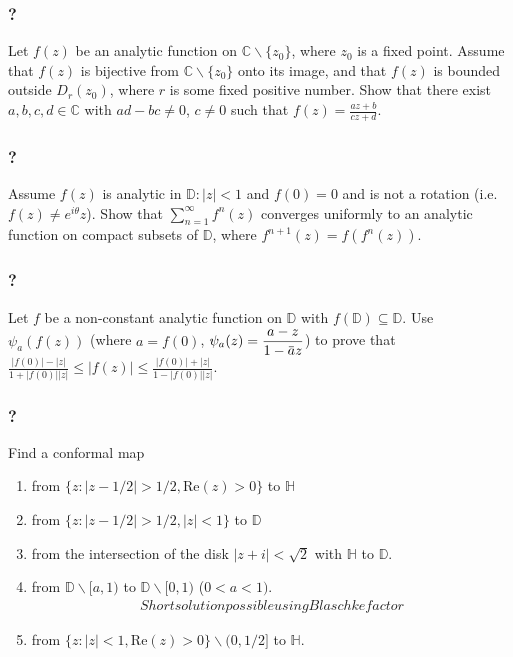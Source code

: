 \hypertarget{section-169}{%
\subsubsection{?}\label{section-169}}

Let \(f(z)\) be an analytic function on
\({\mathbb C} \backslash \{ z_0 \}\), where \(z_0\) is a fixed point.
Assume that \(f(z)\) is bijective from
\({\mathbb C} \backslash \{ z_0 \}\) onto its image, and that \(f(z)\)
is bounded outside \(D_r(z_0)\), where \(r\) is some fixed positive
number. Show that there exist \(a, b, c, d \in \mathbb C\) with
\(ad-bc \neq 0\), \(c \neq 0\) such that
\(\displaystyle f(z) = \frac{az + b}{cz + d}\).

\hypertarget{section-170}{%
\subsubsection{?}\label{section-170}}

Assume \(f(z)\) is analytic in \({\mathbb D}: |z|<1\) and \(f(0)=0\) and
is not a rotation (i.e.~\(f(z) \neq e^{i \theta} z\)). Show that
\(\displaystyle \sum_{n=1}^\infty f^{n}(z)\) converges uniformly to an
analytic function on compact subsets of \({\mathbb D}\), where
\(f^{n+1}(z) = f(f^{n}(z))\).

\hypertarget{section-171}{%
\subsubsection{?}\label{section-171}}

Let \(f\) be a non-constant analytic function on \(\mathbb D\) with
\(f(\mathbb D) \subseteq \mathbb D\). Use \(\psi_{a} (f(z))\) (where
\(a=f(0)\),
\(\displaystyle \psi_a(z) = \frac{a - z}{1 - \mkern 1.5mu\overline{\mkern-1.5mua\mkern-1.5mu}\mkern 1.5muz}\))
to prove that
\(\displaystyle \frac{|f(0)| - |z|}{1 + |f(0)||z|} \leq |f(z)| \leq \frac{|f(0)| + |z|}{1 - |f(0)||z|}\).

\hypertarget{section-172}{%
\subsubsection{?}\label{section-172}}

Find a conformal map

\begin{enumerate}
\def\labelenumi{\arabic{enumi}.}
\item
  from \(\{ z: |z - 1/2| > 1/2, \text{Re}(z)>0 \}\) to \(\mathbb H\)
\item
  from \(\{ z: |z - 1/2| > 1/2, |z| <1 \}\) to \(\mathbb D\)
\item
  from the intersection of the disk \(|z + i| < \sqrt{2}\) with
  \({\mathbb H}\) to \({\mathbb D}\).
\item
  from \({\mathbb D} \backslash [a, 1)\) to
  \({\mathbb D} \backslash [0, 1)\) (\(0<a<1)\).
  \begin{align*} Short solution
  possible using Blaschke factor\end{align*}
\item
  from \(\{ z: |z| < 1, \text{Re}(z) > 0 \} \backslash (0, 1/2]\) to
  \(\mathbb H\).
\end{enumerate}

